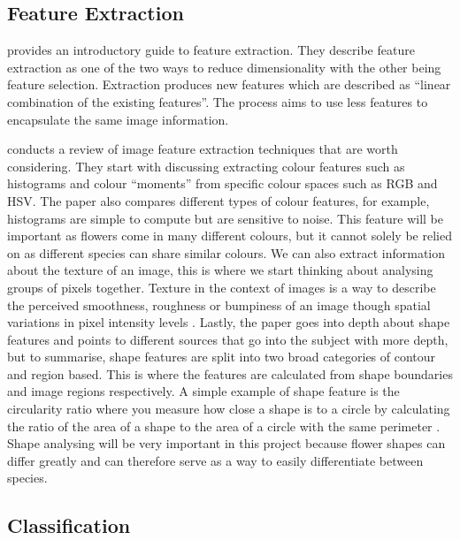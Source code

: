 \documentclass[12pt,a4paper]{report}
\begin{document}
\subsection{Feature Extraction}

\citet{dishaa2021} provides an introductory guide to feature extraction. They describe feature extraction 
as one of the two ways to reduce dimensionality with the other being feature selection. Extraction produces new 
features which are described as “linear combination of the existing features”. The process aims to use less features to 
encapsulate the same image information.

\par

\citet{tian2013} conducts a review of image feature extraction techniques that are worth considering. They 
start with discussing extracting colour features such as histograms and colour “moments” from specific colour spaces 
such as RGB and HSV. The paper also compares different types of colour features, for example, histograms are simple to 
compute but are sensitive to noise.  This feature will be important as flowers come in many different colours, but it 
cannot solely be relied on as different species can share similar colours. We can also extract information about 
the texture of an image, this is where we start thinking about analysing groups of pixels together. Texture in the 
context of images is a way to describe the perceived smoothness, roughness or bumpiness of an image though spatial 
variations in pixel intensity levels \citep{mathworks}. Lastly, the paper goes into depth about shape features and 
points to different sources that go into the subject with more depth, but to summarise, shape features are 
split into two broad categories of contour and region based. This is where the features are calculated from shape 
boundaries and image regions respectively. A simple example of shape feature is the circularity ratio where you measure 
how close a shape is to a circle by calculating the ratio of the area of a shape to the area of a circle with the same 
perimeter \citep{mingqiang2008survey}. Shape analysing will be very important in this project because flower shapes can
differ greatly and can therefore serve as a way to easily differentiate between species.

\subsection{Classification}
\end{document}
